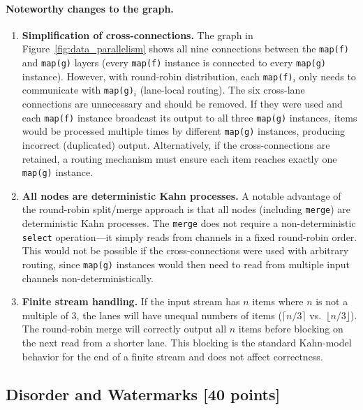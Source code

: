 \documentclass[11pt]{article}
\newcommand{\mnt}[1]{{\small\texttt{#1}}}
\theoremstyle{definition}
\begin{document}
\paragraph{Noteworthy changes to the graph.}

\begin{enumerate}
	\item \textbf{Simplification of cross-connections.} The graph in Figure~\ref{fig:data_parallelism} shows all nine connections between the \mnt{map(f)} and \mnt{map(g)} layers (every \mnt{map(f)} instance is connected to every \mnt{map(g)} instance). However, with round-robin distribution, each \mnt{map(f)}$_i$ only needs to communicate with \mnt{map(g)}$_i$ (lane-local routing). The six cross-lane connections are unnecessary and should be removed. If they were used and each \mnt{map(f)} instance broadcast its output to all three \mnt{map(g)} instances, items would be processed multiple times by different \mnt{map(g)} instances, producing incorrect (duplicated) output. Alternatively, if the cross-connections are retained, a routing mechanism must ensure each item reaches exactly one \mnt{map(g)} instance.

	\item \textbf{All nodes are deterministic Kahn processes.} A notable advantage of the round-robin split/merge approach is that all nodes (including \mnt{merge}) are deterministic Kahn processes. The \mnt{merge} does not require a non-deterministic \mnt{select} operation---it simply reads from channels in a fixed round-robin order. This would not be possible if the cross-connections were used with arbitrary routing, since \mnt{map(g)} instances would then need to read from multiple input channels non-deterministically.

	\item \textbf{Finite stream handling.} If the input stream has $n$ items where $n$ is not a multiple of 3, the lanes will have unequal numbers of items ($\lceil n/3 \rceil$ vs.\ $\lfloor n/3 \rfloor$). The round-robin merge will correctly output all $n$ items before blocking on the next read from a shorter lane. This blocking is the standard Kahn-model behavior for the end of a finite stream and does not affect correctness.
\end{enumerate}

\clearpage %
\subsection{Disorder and Watermarks [40 points]}
\end{document}
